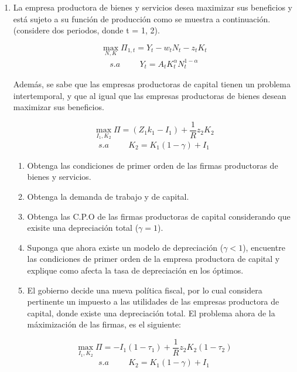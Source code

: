 \documentclass[a4paper,12pt]{article}
\begin{document}
\begin{enumerate}
\newpage
\item La empresa productora de bienes y servicios desea maximizar sus beneficios y está sujeto a su función de producción como se muestra a continuación.(considere dos periodos, donde t = 1, 2). 

\begin{equation*}
\max_{N,K} \Pi_{1,t} =Y_t -w_tN_t - z_t K_t
\end{equation*}
\begin{align*}
    s.a \hspace{1cm} Y_t=A_t K_t^\alpha N^{1-\alpha}_t
\end{align*}

Además, se sabe que las empresas productoras de capital tienen un
problema intertemporal, y que al igual que las empresas productoras
de bienes desean maximizar sus beneficios.

\begin{equation*}
\max_{I_1, K_2}\Pi =(Z_1k_1-I_1)+\frac{1}{R}z_2K_2
\end{equation*}
\begin{align*}
    s.a \hspace{1cm} K_2=K_1(1-\gamma)+I_1
\end{align*}


\begin{enumerate}[label=\alph*)]
\item Obtenga las condiciones de primer orden de las firmas productoras de bienes y servicios.
\item Obtenga la demanda de trabajo y de capital.
\item Obtenga las C.P.O de las firmas productoras de capital considerando que exisite una depreciación total ($\gamma =1$).
\item Suponga que ahora existe un modelo de depreciación ($\gamma<1$), encuentre las condiciones de primer orden de la empresa productora de capital y explique como afecta la tasa de depreciación en los óptimos.
\item El gobierno decide una nueva política fiscal, por lo cual considera pertinente un impuesto a las utilidades de las empresas productora de capital, donde existe una depreciación total. 
El problema ahora de la máximización de las firmas, es el siguiente:
\end{enumerate}

\begin{equation*}
\max_{I_1, K_2}\Pi =-I_1(1-\tau_1)   +\frac{1}{R}z_2K_2(1-\tau_2)
\end{equation*}
\begin{align*}
    s.a \hspace{1cm} K_2=K_1(1-\gamma)+I_1
\end{align*}


\end{enumerate}
\end{document}
